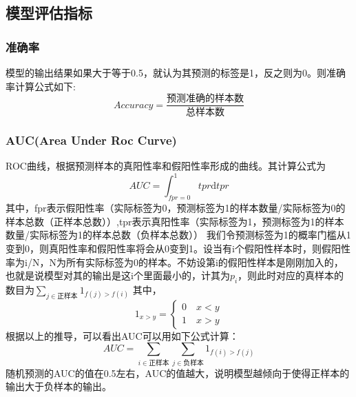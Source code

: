 \subsection{模型评估指标}
\subsubsection{准确率}
模型的输出结果如果大于等于0.5，就认为其预测的标签是1，反之则为0。则准确率计算公式如下: 
\[
Accuracy = \dfrac{\text{预测准确的样本数}}{\text{总样本数}}
\]
\subsubsection{AUC(Area Under Roc Curve)}
ROC曲线，根据预测样本的真阳性率和假阳性率形成的曲线。其计算公式为
\[
    AUC = \int_{fpr=0}^1 tpr \mathrm{d}tpr
\]
其中，fpr表示假阳性率（实际标签为0，预测标签为1的样本数量/实际标签为0的样本总数（正样本总数））,tpr表示真阳性率（实际标签为1，预测标签为1的样本数量/实际标签为1的样本总数（负样本总数））
我们令预测标签为1的概率门槛从1变到0，则真阳性率和假阳性率将会从0变到1。设当有i个假阳性样本时，则假阳性率为i/N，N为所有实际标签为0的样本。不妨设第i的假阳性样本是刚刚加入的，也就是说模型对其的输出是这i个里面最小的，计其为$p_i$，则此时对应的真样本的数目为$\sum\limits_{j \in \text{正样本}} 1_{f(j) > f(i)}$
其中，
\[
1_{x>y} =\begin{cases}  0 \quad x<y \\ 1 \quad x>y \end{cases}
\]
根据以上的推导，可以看出AUC可以用如下公式计算：
\[
    AUC = \sum\limits_{i \in \text{正样本} } \sum\limits_{j \in \text{负样本} }{1_{f(i)>f(j)}}
\]
随机预测的AUC的值在0.5左右，AUC的值越大，说明模型越倾向于使得正样本的输出大于负样本的输出。